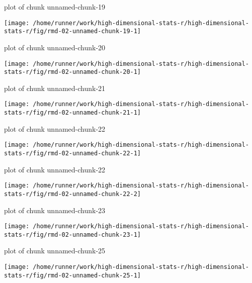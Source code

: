 \documentclass[ignorenonframetext,]{beamer}
\begin{document}
\begin{frame}{plot of chunk unnamed-chunk-19}
\protect\hypertarget{plot-of-chunk-unnamed-chunk-19}{}

\texttt{[image: /home/runner/work/high-dimensional-stats-r/high-dimensional-stats-r/fig/rmd-02-unnamed-chunk-19-1]}



\end{frame}

\begin{frame}{plot of chunk unnamed-chunk-20}
\protect\hypertarget{plot-of-chunk-unnamed-chunk-20}{}

\texttt{[image: /home/runner/work/high-dimensional-stats-r/high-dimensional-stats-r/fig/rmd-02-unnamed-chunk-20-1]}



\end{frame}

\begin{frame}{plot of chunk unnamed-chunk-21}
\protect\hypertarget{plot-of-chunk-unnamed-chunk-21}{}

\texttt{[image: /home/runner/work/high-dimensional-stats-r/high-dimensional-stats-r/fig/rmd-02-unnamed-chunk-21-1]}



\end{frame}

\begin{frame}{plot of chunk unnamed-chunk-22}
\protect\hypertarget{plot-of-chunk-unnamed-chunk-22}{}

\texttt{[image: /home/runner/work/high-dimensional-stats-r/high-dimensional-stats-r/fig/rmd-02-unnamed-chunk-22-1]}



\end{frame}

\begin{frame}{plot of chunk unnamed-chunk-22}
\protect\hypertarget{plot-of-chunk-unnamed-chunk-22-1}{}

\texttt{[image: /home/runner/work/high-dimensional-stats-r/high-dimensional-stats-r/fig/rmd-02-unnamed-chunk-22-2]}



\end{frame}

\begin{frame}{plot of chunk unnamed-chunk-23}
\protect\hypertarget{plot-of-chunk-unnamed-chunk-23}{}

\texttt{[image: /home/runner/work/high-dimensional-stats-r/high-dimensional-stats-r/fig/rmd-02-unnamed-chunk-23-1]}



\end{frame}

\begin{frame}{plot of chunk unnamed-chunk-25}
\protect\hypertarget{plot-of-chunk-unnamed-chunk-25}{}

\texttt{[image: /home/runner/work/high-dimensional-stats-r/high-dimensional-stats-r/fig/rmd-02-unnamed-chunk-25-1]}



\end{frame}
\end{document}

